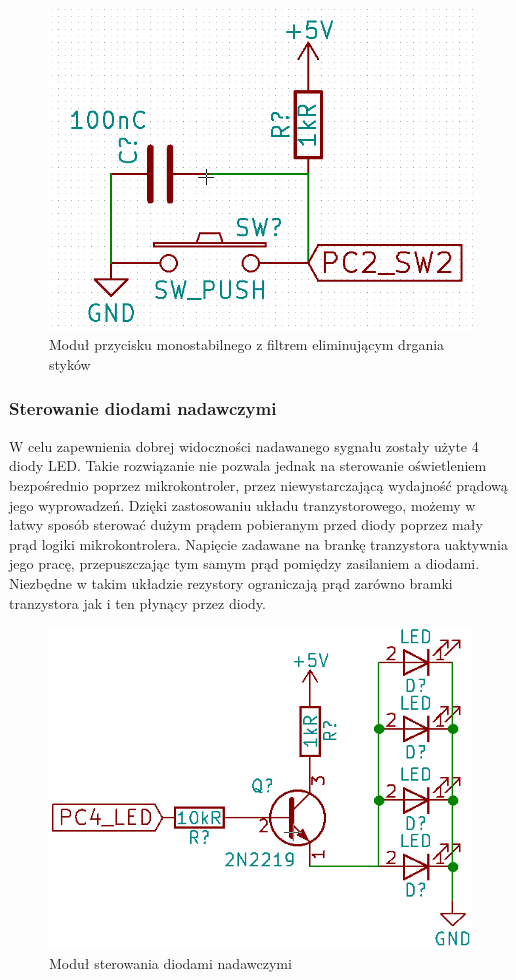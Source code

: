 \documentclass{article}
\begin{document}
\begin{figure}[h!]
	\center
	\includegraphics[scale=0.3]{img/drgania_stykow.png}
	\caption{Moduł przycisku monostabilnego z filtrem eliminującym drgania styków}
	\label{fig:zdjecie2}
\end{figure}

\newpage
\subsubsection{Sterowanie diodami nadawczymi}
W celu zapewnienia dobrej widoczności nadawanego sygnału zostały użyte 4 diody LED. Takie rozwiązanie nie pozwala jednak na sterowanie oświetleniem bezpośrednio poprzez mikrokontroler, przez niewystarczającą wydajność prądową jego wyprowadzeń. Dzięki zastosowaniu układu tranzystorowego, możemy w łatwy sposób sterować dużym prądem pobieranym przed diody poprzez mały prąd logiki mikrokontrolera. Napięcie zadawane na brankę tranzystora uaktywnia jego pracę, przepuszczając tym samym prąd pomiędzy zasilaniem a diodami. Niezbędne w takim układzie rezystory ograniczają prąd zarówno bramki tranzystora jak i ten płynący przez diody. 

\begin{figure}[h!]
	\center
	\includegraphics[scale=0.3]{img/sterowanie_diodami.png}
	\caption{Moduł sterowania diodami nadawczymi}
	\label{fig:zdjecie3}
\end{figure}
\end{document}
